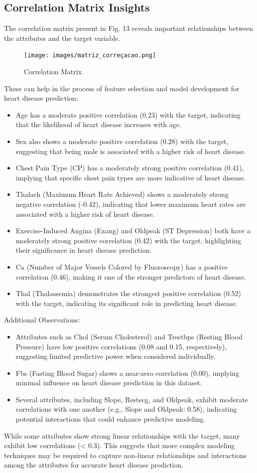 \subsection{Correlation Matrix Insights} 
The correlation matrix present in Fig. 13 reveals important relationships between the attributes and the target variable. 
\begin{figure}[H]
    \centering
    \texttt{[image: images/matriz\_correçacao.png]}
    \caption{Correlation Matrix}
    \label{fig:enter-label}
\end{figure}

These can help in the process of feature selection and model development for heart disease prediction:
\begin{itemize}
    \item Age has a moderate positive correlation (0.23) with the target, indicating that the likelihood of heart disease increases with age.
    \item Sex also shows a moderate positive correlation (0.28) with the target, suggesting that being male is associated with a higher risk of heart disease.
    \item Chest Pain Type (CP) has a moderately strong positive correlation (0.41), implying that specific chest pain types are more indicative of heart disease.
    \item Thalach (Maximum Heart Rate Achieved) shows a moderately strong negative correlation (-0.42), indicating that lower maximum heart rates are associated with a higher risk of heart disease.
    \item Exercise-Induced Angina (Exang) and Oldpeak (ST Depression) both have a moderately strong positive correlation (0.42) with the target, highlighting their significance in heart disease prediction.
    \item Ca (Number of Major Vessels Colored by Fluoroscopy) has a positive correlation (0.46), making it one of the stronger predictors of heart disease.
    \item Thal (Thalassemia) demonstrates the strongest positive correlation (0.52) with the target, indicating its significant role in predicting heart disease.
\end{itemize}

Additional Observations:

\begin{itemize}
    \item Attributes such as Chol (Serum Cholesterol) and Trestbps (Resting Blood Pressure) have low positive correlations (0.08 and 0.15, respectively), suggesting limited predictive power when considered individually.
    \item Fbs (Fasting Blood Sugar) shows a near-zero correlation (0.00), implying minimal influence on heart disease prediction in this dataset.
    \item Several attributes, including Slope, Restecg, and Oldpeak, exhibit moderate correlations with one another (e.g., Slope and Oldpeak: 0.58), indicating potential interactions that could enhance predictive modeling.
\end{itemize}

While some attributes show strong linear relationships with the target, many exhibit low correlations (< 0.3). This suggests that more complex modeling techniques may be required to capture non-linear relationships and interactions among the attributes for accurate heart disease prediction.